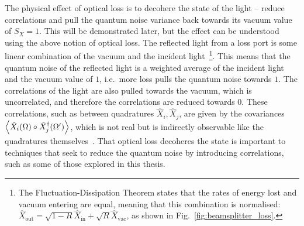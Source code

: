 The physical effect of optical loss is to decohere the state of the light -- reduce correlations and pull the quantum noise variance back towards its vacuum value of $S_X=1$. This will be demonstrated later, but the effect can be understood using the above notion of optical loss. The reflected light from a loss port is some linear combination of the vacuum and the incident light~\footnote{The Fluctuation-Dissipation Theorem states that the rates of energy lost and vacuum entering are equal, meaning that this combination is normalised: $\hat X_\text{out}=\sqrt{1-R}\hat X_\text{in}+\sqrt{R}\hat X_\text{vac}$, as shown in Fig.~\ref{fig:beamsplitter_loss}.}. This means that the quantum noise of the reflected light is a weighted average of the incident light and the vacuum value of $1$, i.e.\ more loss pulls the quantum noise towards $1$. The correlations of the light are also pulled towards the vacuum, which is uncorrelated, and therefore the correlations are reduced towards $0$. These correlations, such as between quadratures $\hat{X}_i, \hat{X}_j$, are given by the covariances $\ev{\hat{X}_i(\Omega)\circ\hat{X}_j^\dag(\Omega')}$, which is not real but is indirectly observable like the quadratures themselves~\cite{}. That optical loss decoheres the state is important to techniques that seek to reduce the quantum noise by introducing correlations, such as some of those explored in this thesis.

